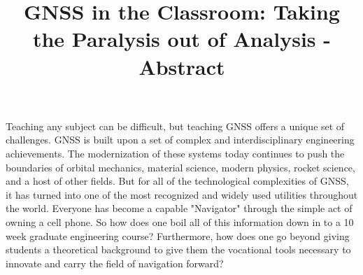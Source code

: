 \documentclass[12pt, conference, onecolumn, draftclsnofoot]{IEEEtran}
\begin{document}
\title{GNSS in the Classroom: Taking the Paralysis out of Analysis - Abstract}

\author{
\and
{}
\and
{}
\and
{}
}

\begin{singlespace}
    \maketitle 
\end{singlespace}

Teaching any subject can be difficult, but teaching GNSS offers a unique set of challenges.
GNSS is built upon a set of complex and interdisciplinary engineering achievements. 
The modernization of these systems today continues to push the boundaries of orbital mechanics, material science, modern physics, rocket science, and a host of other fields.
But for all of the technological complexities of GNSS, it has turned into one of the most recognized and widely used utilities throughout the world.
Everyone has become a capable "Navigator" through the simple act of owning a cell phone.
So how does one boil all of this information down in to a 10 week graduate engineering course?
Furthermore, how does one go beyond giving students a theoretical background to give them the vocational tools necessary to innovate and carry the field of navigation forward?
\end{document}

